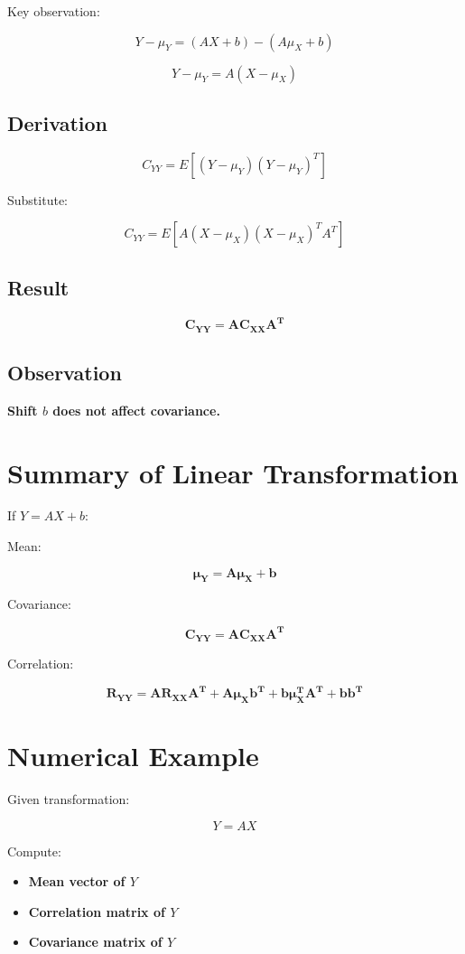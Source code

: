 \documentclass[12pt]{article}
\begin{document}
Key observation:

\[
Y - \mu_Y = (AX + b) - (A\mu_X + b)
\]

\[
Y - \mu_Y = A(X - \mu_X)
\]

\subsection{Derivation}

\[
C_{YY} = E[(Y - \mu_Y)(Y - \mu_Y)^T]
\]

Substitute:

\[
C_{YY} = E[A(X - \mu_X)(X - \mu_X)^TA^T]
\]

\subsection{Result}

\[
\boxed{\mathbf{C_{YY} = AC_{XX}A^T}}
\]

\subsection{Observation}

\textbf{Shift $b$ does not affect covariance.}

\section{Summary of Linear Transformation}

If $Y = AX + b$:

Mean:

\[
\boxed{\mathbf{\mu_Y = A\mu_X + b}}
\]

Covariance:

\[
\boxed{\mathbf{C_{YY} = AC_{XX}A^T}}
\]

Correlation:

\[
\boxed{\mathbf{R_{YY} = AR_{XX}A^T + A\mu_Xb^T + b\mu_X^TA^T + bb^T}}
\]

\section{Numerical Example}

Given transformation:

\[
\boxed{Y = AX}
\]

Compute:

\begin{itemize}
\item \textbf{Mean vector of $Y$}
\item \textbf{Correlation matrix of $Y$}
\item \textbf{Covariance matrix of $Y$}
\end{itemize}
\end{document}
